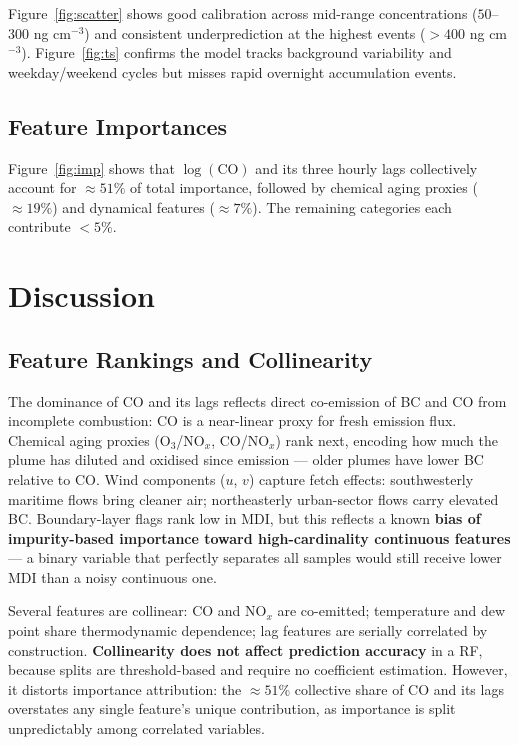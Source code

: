 \documentclass[11pt, a4paper]{article}
\begin{document}
Figure~\ref{fig:scatter} shows good calibration across mid-range concentrations
($50$–$300$ ng cm$^{-3}$) and consistent underprediction at the highest events
($>\!400$ ng cm$^{-3}$). Figure~\ref{fig:ts} confirms the model tracks background
variability and weekday/weekend cycles but misses rapid overnight accumulation events.

\subsection{Feature Importances}

Figure~\ref{fig:imp} shows that $\log(\mathrm{CO})$ and its three hourly lags collectively
account for ${\approx}51\%$ of total importance, followed by chemical aging proxies
(${\approx}19\%$) and dynamical features (${\approx}7\%$). The remaining categories each
contribute $<5\%$.

\section{Discussion}

\subsection{Feature Rankings and Collinearity}

The dominance of CO and its lags reflects direct co-emission of BC and CO from incomplete
combustion: CO is a near-linear proxy for fresh emission flux. Chemical aging proxies
(O$_3$/NO$_x$, CO/NO$_x$) rank next, encoding how much the plume has diluted and oxidised
since emission — older plumes have lower BC relative to CO. Wind components ($u$, $v$)
capture fetch effects: southwesterly maritime flows bring cleaner air; northeasterly
urban-sector flows carry elevated BC. Boundary-layer flags rank low in MDI, but this
reflects a known \textbf{bias of impurity-based importance toward high-cardinality continuous
features} \cite{james2023} — a binary variable that perfectly separates all samples would still
receive lower MDI than a noisy continuous one.

Several features are collinear: CO and NO$_x$ are co-emitted; temperature and dew point
share thermodynamic dependence; lag features are serially correlated by construction.
\textbf{Collinearity does not affect prediction accuracy} in a RF, because splits are
threshold-based and require no coefficient estimation. However, it distorts importance
attribution: the ${\approx}51\%$ collective share of CO and its lags overstates any single
feature's unique contribution, as importance is split unpredictably among correlated variables.
\end{document}
